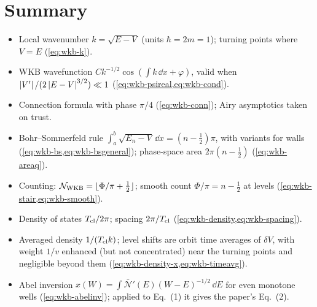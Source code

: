 \section{Summary}\label{sec:wkb-summary}
\begin{itemize}
\item Local wavenumber $k=\sqrt{E-V}$ (units $\hbar=2m=1$); turning points where $V=E$ (\cref{eq:wkb-k}).
\item WKB wavefunction $Ck^{-1/2}\cos(\int k\,\dd x+\varphi)$, valid when $\left\lvert V'\right\rvert/(2\left\lvert E-V\right\rvert^{3/2})\ll1$ (\cref{eq:wkb-psireal,eq:wkb-cond}).
\item Connection formula with phase $\pi/4$ (\cref{eq:wkb-conn}); Airy asymptotics taken on trust.
\item Bohr--Sommerfeld rule $\int_a^b\sqrt{E_n-V}\,\dd x=(n-\frac12)\pi$, with variants for walls (\cref{eq:wkb-bs,eq:wkb-bsgeneral}); phase-space area $2\pi(n-\frac12)$ (\cref{eq:wkb-areaq}).
\item Counting: $\mathcal N_{\rm WKB}=\lfloor\Phi/\pi+\frac12\rfloor$; smooth count $\Phi/\pi=n-\frac12$ at levels (\cref{eq:wkb-stair,eq:wkb-smooth}).
\item Density of states $T_{\rm cl}/2\pi$; spacing $2\pi/T_{\rm cl}$ (\cref{eq:wkb-density,eq:wkb-spacing}).
\item Averaged density $1/(T_{\rm cl}k)$; level shifts are orbit time averages of $\delta V$, with weight $1/v$ enhanced (but not concentrated) near the turning points and negligible beyond them (\cref{eq:wkb-density-x,eq:wkb-timeavg}).
\item Abel inversion $x(W)=\int\bar{\mathcal N}'(E)(W-E)^{-1/2}\,\dd E$ for even monotone wells (\cref{eq:wkb-abelinv}); applied to Eq.~(1) it gives the paper's Eq.~(2).
\end{itemize}

